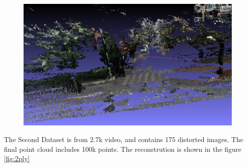 \documentclass[11pt]{article}
\begin{document}
\begin{figure}
    \includegraphics[width=\textwidth,height=\textheight,keepaspectratio]{images/1.ply.dense.3.png}
    \label{fig:1ply}
    \end{figure}

    The Second Dataset is from 2.7k video, and contains 175 distorted images. The final point cloud includes
    100k points. The reconstrution is shown in the figure \ref{fig:2ply}
\end{document}
